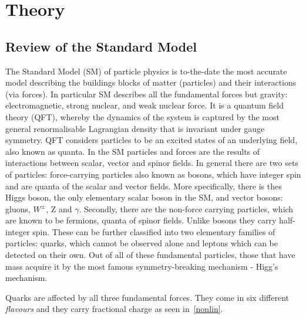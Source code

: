 \chapter{Theory}
\section{Review of the Standard Model}
The Standard Model (SM) of particle physics is to-the-date the most accurate model describing the buildings blocks of matter (particles) and their interactions (via forces). In particular SM describes all the fundamental forces but gravity: electromagnetic, strong nuclear, and weak nuclear force. It is a quantum field theory (QFT), whereby the dynamics of the system is captured by the most general renormalisable Lagrangian density that is invariant under gauge symmetry. QFT considers particles to be an excited states of an underlying field, also known as quanta. In the SM particles and forces are the results of interactions between scalar, vector and spinor fields. In general there are two sets of particles: force-carrying particles also known as bosons, which have integer spin and are quanta of the scalar and vector fields. More specifically, there is thes Higgs boson, the only elementary scalar boson in the SM, and vector bosons: gluons, $W^{\pm}$, Z and $\gamma$. Secondly, there are the non-force carrying particles, which are known to be fermions, quanta of spinor fields. Unlike bosons they carry half-integer spin. These can be further classified into two elementary families of particles: quarks, which cannot be observed alone and leptons which can be detected on their own. Out of all of these fundamental particles, those that have mass acquire it by the most famous symmetry-breaking mechanism - Higg's mechanism.

Quarks are affected by all three fundamental forces. They come in six different \textit{flavours} and they carry fractional charge as seen in~\autoref{nonlin}.

